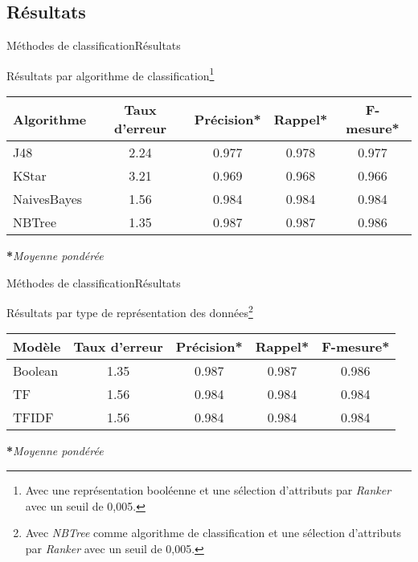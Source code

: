 \subsection{Résultats}
\begin{frame}{Méthodes de classification}{Résultats}

  Résultats par algorithme de classification\footnote{Avec une représentation booléenne et une sélection d'attributs par \textit{Ranker} avec un seuil de
 0,005. }

  \begin{center}
    \scriptsize
    \begin{tabular}{l cccc} 
      \hline
      \textbf{Algorithme} & \textbf{Taux d'erreur} & \textbf{Précision*} & \textbf{Rappel*} & \textbf{F-mesure*}\\
      \hline
      J48 & 2.24 & 0.977 & 0.978 & 0.977\\
      KStar & 3.21 & 0.969 & 0.968 & 0.966\\
      NaivesBayes & 1.56 & 0.984 & 0.984 & 0.984\\
      NBTree & 1.35 & 0.987 & 0.987 & 0.986\\
    \end{tabular}
  \end{center}    
    \scriptsize\textbf{*}\textit{Moyenne pondérée}

\end{frame}


\begin{frame}{Méthodes de classification}{Résultats}
  
  Résultats par type de représentation des données\footnote{Avec \textit{NBTree} comme algorithme de classification et une sélection d'attributs par \textit{Ranker} avec un seuil de 0,005. }
  
  \begin{center}
    \scriptsize
    \begin{tabular}{l cccc} 
      \hline
      \textbf{Modèle} & \textbf{Taux d'erreur}& \textbf{Précision*} & \textbf{Rappel*} & \textbf{F-mesure*}\\
      \hline
      Boolean & 1.35 & 0.987 & 0.987 & 0.986\\
      TF      & 1.56 & 0.984 & 0.984 & 0.984\\
      TFIDF   & 1.56 & 0.984 & 0.984 & 0.984 \\
    \end{tabular}
  \end{center}    
    \scriptsize\textbf{*}\textit{Moyenne pondérée}

  
\end{frame}
